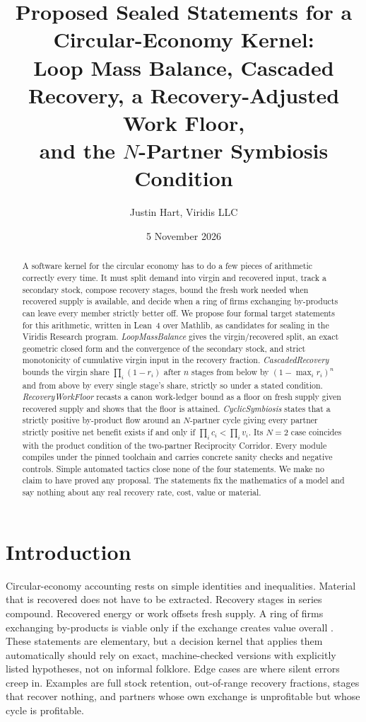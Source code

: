 \documentclass[11pt]{article}
\title{Proposed Sealed Statements for a Circular-Economy Kernel:\\
Loop Mass Balance, Cascaded Recovery, a Recovery-Adjusted Work Floor,\\
and the $N$-Partner Symbiosis Condition}
\author{Justin Hart, Viridis LLC}
\date{5 November 2026}
\theoremstyle{remark}
\begin{document}
\maketitle

\begin{abstract}
A software kernel for the circular economy has to do a few pieces of arithmetic correctly every
time. It must split demand into virgin and recovered input, track a secondary stock, compose
recovery stages, bound the fresh work needed when recovered supply is available, and decide
when a ring of firms exchanging by-products can leave every member strictly better off. We
propose four formal target statements for this arithmetic, written in Lean~4 over Mathlib, as
candidates for sealing in the Viridis Research program. \emph{LoopMassBalance} gives the
virgin/recovered split, an exact geometric closed form and the convergence of the secondary
stock, and strict monotonicity of cumulative virgin input in the recovery fraction.
\emph{CascadedRecovery} bounds the virgin share $\prod_i(1-r_i)$ after $n$ stages from below by
$(1-\max_i r_i)^n$ and from above by every single stage's share, strictly so under a stated
condition. \emph{RecoveryWorkFloor} recasts a canon work-ledger bound as a floor on fresh supply
given recovered supply and shows that the floor is attained. \emph{CyclicSymbiosis} states that a
strictly positive by-product flow around an $N$-partner cycle giving every partner strictly
positive net benefit exists if and only if $\prod_i c_i<\prod_i v_i$. Its $N=2$ case coincides
with the product condition of the two-partner Reciprocity Corridor. Every module compiles under
the pinned toolchain and carries concrete sanity checks and negative controls. Simple automated
tactics close none of the four statements. We make no claim to have proved any proposal. The
statements fix the mathematics of a model and say nothing about any real recovery rate, cost,
value or material.
\end{abstract}

\section{Introduction}
Circular-economy accounting rests on simple identities and inequalities. Material that is
recovered does not have to be extracted. Recovery stages in series compound. Recovered energy
or work offsets fresh supply. A ring of firms exchanging by-products is viable only if the
exchange creates value overall
\citep{geissdoerfer2017,chertow2000}. These statements are elementary, but a decision kernel that
applies them automatically should rely on exact, machine-checked versions with explicitly listed
hypotheses, not on informal folklore. Edge cases are where silent errors creep in. Examples are
full stock retention, out-of-range recovery fractions, stages that recover nothing, and partners
whose own exchange is unprofitable but whose cycle is profitable.
\end{document}
